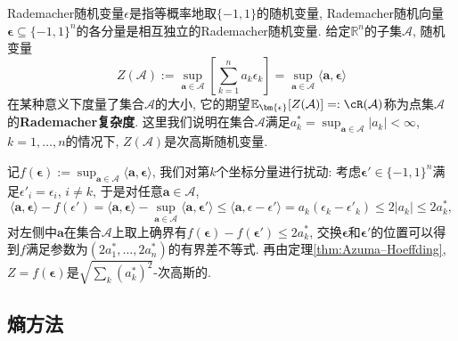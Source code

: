 \begin{example}[点集的Rademacher复杂度]\label{ex:RCofPtSet}
	Rademacher随机变量$\epsilon$是指等概率地取$\{-1, 1\}$的随机变量, 
	Rademacher随机向量$\bm{\epsilon} \subseteq \{-1,1\}^n$的各分量是相互独立的Rademacher随机变量. 
	给定$\mathbb{R}^n$的子集$\mathcal{A}$, 随机变量
	\begin{equation*}
		Z(\mathcal{A})
		:= \sup_{\bm{a} \in \mathcal{A}} \left[ \sum_{k=1}^n a_k \epsilon_k \right]
		= \sup_{\bm{a} \in \mathcal{A}} \langle \bm{a}, \bm{\epsilon} \rangle
	\end{equation*}
	在某种意义下度量了集合$\mathcal{A}$的大小, 它的期望$\mathbb{E}_{\bm{\epsilon}}[Z(\mathcal{A})] =: \cR(\mathcal{A})$称为点集$\mathcal{A}$的\textbf{Rademacher复杂度}. 
	这里我们说明在集合$\mathcal{A}$满足$a_k^* = \sup_{\bm{a} \in \mathcal{A}} |a_k| < \infty$, $k = 1, \dots, n$的情况下, $Z(\mathcal{A})$是次高斯随机变量. 
	
	记$f(\bm{\epsilon}) := \sup_{\bm{a} \in \mathcal{A}} \langle \bm{a}, \bm{\epsilon} \rangle$, 我们对第$k$个坐标分量进行扰动: 
	考虑$\bm{\epsilon}' \in \{-1, 1\}^n$满足$\epsilon'_i = \epsilon_i$, $i \neq k$, 于是对任意$\bm{a} \in \mathcal{A}$, 
	\begin{equation*}
		\langle \bm{a}, \bm{\epsilon} \rangle - f(\epsilon')
		= \langle \bm{a}, \bm{\epsilon} \rangle - \sup_{\bm{a} \in \mathcal{A}} \langle \bm{a}, \bm{\epsilon}' \rangle
		\leq \langle \bm{a}, \epsilon - \epsilon' \rangle
		= a_k (\epsilon_k - \epsilon'_k)
		\leq 2 |a_k|
		\leq 2 a_k^*, 
	\end{equation*}
	对左侧中$\bm{a}$在集合$\mathcal{A}$上取上确界有$f(\bm{\epsilon}) - f(\bm{\epsilon}') \leq 2 a_k^*$, 交换$\bm{\epsilon}$和$\bm{\epsilon}'$的位置可以得到$f$满足参数为$(2a_1^*, \dots, 2a_n^*)$的有界差不等式. 
	再由定理\ref{thm:Azuma–Hoeffding}, $Z = f(\bm{\epsilon})$是$\sqrt{\sum_k (a_k^*)^2}$-次高斯的. 
\end{example}


\subsection{熵方法}

